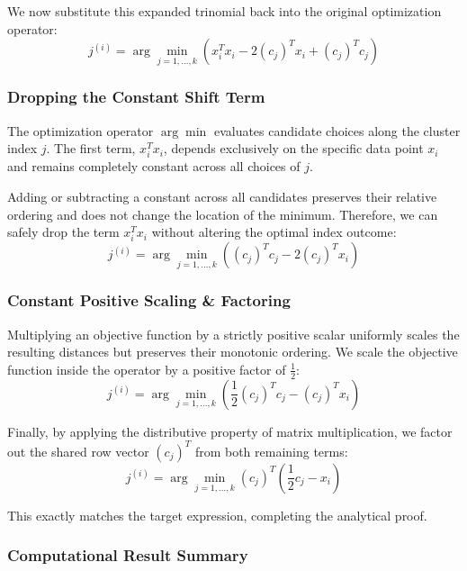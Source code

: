 \documentclass[twoside, 10pt]{article}
\begin{document}
We now substitute this expanded trinomial back into the original optimization operator:
\begin{equation}
j^{(i)} = \arg\min_{j=1, \dots, k} \left( x_i^T x_i - 2(c_j)^T x_i + (c_j)^T c_j \right)
\end{equation}

\subsubsection{Dropping the Constant Shift Term} %
The optimization operator $\arg\min$ evaluates candidate choices along the cluster index $j$. The first term, $x_i^T x_i$, depends exclusively on the specific data point $x_i$ and remains completely constant across all choices of $j$. 

Adding or subtracting a constant across all candidates preserves their relative ordering and does not change the location of the minimum. Therefore, we can safely drop the term $x_i^T x_i$ without altering the optimal index outcome:
\begin{equation}
j^{(i)} = \arg\min_{j=1, \dots, k} \left( (c_j)^T c_j - 2(c_j)^T x_i \right)
\end{equation}

\subsubsection{Constant Positive Scaling \& Factoring} %
Multiplying an objective function by a strictly positive scalar uniformly scales the resulting distances but preserves their monotonic ordering. We scale the objective function inside the operator by a positive factor of $\frac{1}{2}$:
\begin{equation}
j^{(i)} = \arg\min_{j=1, \dots, k} \left( \frac{1}{2}(c_j)^T c_j - (c_j)^T x_i \right)
\end{equation}

Finally, by applying the distributive property of matrix multiplication, we factor out the shared row vector $(c_j)^T$ from both remaining terms:
\begin{equation}
j^{(i)} = \arg\min_{j=1, \dots, k} (c_j)^T \left( \frac{1}{2}c_j - x_i \right)
\end{equation}

This exactly matches the target expression, completing the analytical proof.

\subsubsection{Computational Result Summary} %
\end{document}
